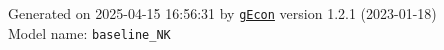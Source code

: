\documentclass[10pt,a4paper]{article}
\numberwithin{equation}{section}
\begin{document}
\begin{landscape}
\begin{flushleft}{\large
Generated  on 2025-04-15 16:56:31 by \href{http://gecon.r-forge.r-project.org/}{\texttt{gEcon}} version 1.2.1 (2023-01-18)\\
Model name: \verb+baseline_NK+
}\end{flushleft}


\end{landscape}

\end{document}
